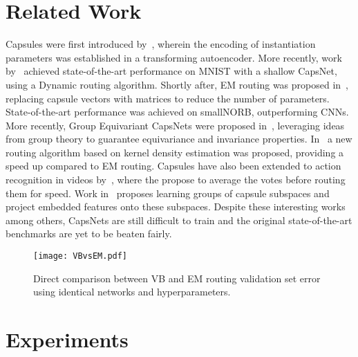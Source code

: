 \documentclass[letterpaper]{article} \usepackage{aaai20}  \usepackage{times}  \usepackage{helvet} \usepackage{courier}  \usepackage[hyphens]{url}  \usepackage{graphicx} \urlstyle{rm} \def\UrlFont{\rm}  \usepackage{graphicx}  \frenchspacing  \setlength{\pdfpagewidth}{8.5in}  \setlength{\pdfpageheight}{11in}  \nocopyright
\begin{document}
\section{Related Work}
Capsules were first introduced by~\cite{hinton2011transforming}, wherein the encoding of instantiation parameters was established in a transforming autoencoder. More recently, work by~\cite{sabour2017dynamic} achieved state-of-the-art performance on MNIST with a shallow CapsNet, using a Dynamic routing algorithm. Shortly after, EM routing was proposed in~\cite{hinton2018matrix}, replacing capsule vectors with matrices to reduce the number of parameters. State-of-the-art performance was achieved on smallNORB, outperforming CNNs. More recently, Group Equivariant CapsNets were proposed in~\cite{lenssen2018group}, leveraging ideas from group theory to guarantee equivariance and invariance properties. In~\cite{zhang2018fast} a new routing algorithm based on kernel density estimation was proposed, providing a speed up compared to EM routing. Capsules have also been extended to action recognition in videos by~\cite{duarte2018videocapsulenet}, where the propose to average the votes before routing them for speed. Work in~\cite{zhang2018cappronet} proposes learning groups of capsule subspaces and project embedded features onto these subspaces. Despite these interesting works among others, CapsNets are still difficult to train and the original state-of-the-art benchmarks are yet to be beaten fairly.
\begin{figure*}[t]
    \centering
    \texttt{[image: VBvsEM.pdf]}
 \caption{Direct comparison between VB and EM routing validation set error using identical networks and hyperparameters.} 
\label{loss_curves}
\end{figure*}
\section{Experiments}
\end{document}
